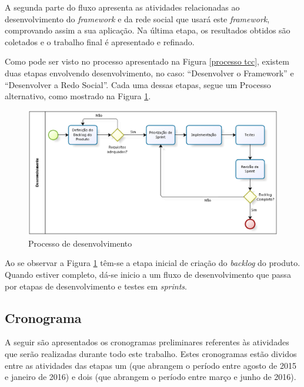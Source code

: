 A segunda parte do fluxo apresenta as atividades relacionadas ao desenvolvimento do \textit{framework} e da rede social que usará este \textit{framework}, comprovando assim a sua aplicação. Na última etapa, os resultados obtidos são coletados e o trabalho final é apresentado e refinado.

Como pode ser visto no processo apresentado na Figura \ref{processo tcc}, existem duas etapas  envolvendo desenvolvimento, no caso: ``Desenvolver o Framework'' e ``Desenvolver a Redo Social''. Cada uma dessas etapas, segue um Processo alternativo, como mostrado na Figura \ref{Processo desenvolvimento}.

\begin{figure}[h]
	\centering
	\includegraphics[scale=0.4]{figuras/capitulo4/processo_desenvolvimento.eps}
	\caption{Processo de desenvolvimento}
	\label{Processo desenvolvimento}
\end{figure}

Ao se observar a Figura \ref{Processo desenvolvimento} têm-se a etapa inicial de criação do \textit{backlog} do produto. Quando estiver completo, dá-se inicio a um fluxo de desenvolvimento que passa por etapas de desenvolvimento e testes em \textit{sprints}.

\subsection{Cronograma}

A seguir são apresentados os cronogramas preliminares referentes às atividades que serão realizadas durante todo este trabalho. Estes cronogramas estão dividos entre as atividades das etapas um (que abrangem o período entre agosto de 2015 e janeiro de 2016) e dois (que abrangem o período entre março e junho de 2016).


